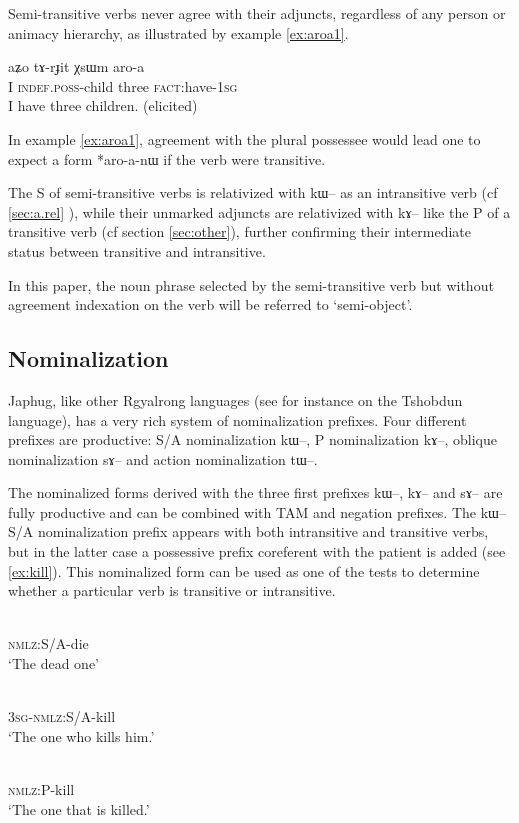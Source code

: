 \documentclass[oldfontcommands,oneside,a4paper,11pt]{article}
\newcommand{\ipa}[1]{{\phon #1}} %
\begin{document}
Semi-transitive verbs never agree with their adjuncts, regardless of any person or animacy hierarchy, as illustrated by example \ref{ex:aroa1}.


 \begin{exe}
   \ex   \label{ex:aroa1}
 \gll 
\ipa{aʑo}  	\ipa{tɤ-rɟit}  	\ipa{χsɯm}  	\ipa{aro-a}   \\
I \textsc{indef.poss}-child three \textsc{fact:}have-\textsc{1sg} \\
 \glt   I have three children. (elicited)
   \end{exe} 

 
In example \ref{ex:aroa1}, agreement with the plural possessee would lead one to expect a form *\ipa{aro-a-nɯ} if the verb were transitive.

The S of semi-transitive verbs is relativized with \ipa{kɯ}-- as an intransitive verb (cf  \ref{sec:a.rel} ), while their unmarked adjuncts are relativized with \ipa{kɤ--} like the P of a transitive verb (cf section \ref{sec:other}), further confirming their intermediate status between transitive and intransitive.

In this paper, the noun phrase selected by the semi-transitive verb but without agreement indexation on the verb will be referred to `semi-object'.

\subsection{Nominalization} \label{sec:nmlz}

Japhug, like other Rgyalrong languages (see for instance \citealt{jackson03caodeng} on the Tshobdun language), has a very rich system of nominalization prefixes. Four different prefixes are productive:   S/A nominalization \ipa{kɯ--},   P nominalization \ipa{kɤ--},   oblique nominalization \ipa{sɤ--}  and   action nominalization \ipa{tɯ--}.  

 
The nominalized forms derived with the three first prefixes \ipa{kɯ--}, \ipa{kɤ}-- and \ipa{sɤ}-- are fully productive and can be combined with TAM and negation prefixes.  The \ipa{kɯ--} S/A nominalization prefix appears with both intransitive and transitive verbs, but in the latter case a possessive prefix  coreferent with the patient is added (see \ref{ex:kill}). This nominalized form can be used as one of the tests to determine whether a particular verb is transitive or intransitive.  

 \begin{exe}
\ex
\gll \ipa{kɯ-si}    \\
  \textsc{nmlz}:S/A-die \\
 \glt  `The dead one'
 
\ex \label{ex:kill}
\gll \ipa{ɯ-kɯ-sat}    \\
  \textsc{3sg}-\textsc{nmlz}:S/A-kill \\
 \glt  `The one who kills him.'
 

\ex \label{ex:kill2}
\gll \ipa{kɤ-sat}    \\
   \textsc{nmlz}:P-kill \\
 \glt  `The one that is killed.'
 \end{exe}
 
\end{document}

